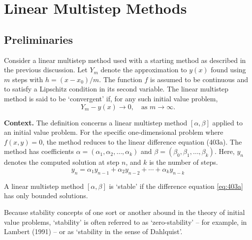 \chapter{Linear Multistep Methods}

\section{Preliminaries}

\begin{definition}

  \label{def:402A}
Consider a linear multistep method used with a starting method as described in the previous discussion. Let $Y_m$ denote the approximation to $y(x)$ found using $m$ steps with $h = (x - x_0)/m$. The function $f$ is assumed to be continuous and to satisfy a Lipschitz condition in its second variable. The linear multistep method is said to be `convergent' if, for any such initial value problem,
\[
Y_m - y(x) \to 0, \quad \text{as } m \to \infty.
\]
\end{definition}

\noindent\textbf{Context.}
The definition concerns a linear multistep method $[\alpha, \beta]$ applied to an initial value problem. For the specific one-dimensional problem where $f(x, y) = 0$, the method reduces to the linear difference equation (403a). The method has coefficients $\alpha = (\alpha_1, \alpha_2, \dots, \alpha_k)$ and $\beta = (\beta_0, \beta_1, \dots, \beta_k)$. Here, $y_n$ denotes the computed solution at step $n$, and $k$ is the number of steps.
\begin{equation}
y_n = \alpha_1 y_{n-1} + \alpha_2 y_{n-2} + \cdots + \alpha_k y_{n-k}
\tag{403a}
\end{equation}

\begin{definition}

  \label{def:403A}
A linear multistep method $[\alpha, \beta]$ is `stable' if the difference equation \eqref{eq:403a} has only bounded solutions.

Because stability concepts of one sort or another abound in the theory of initial value problems, `stability' is often referred to as `zero-stability' -- for example, in Lambert (1991) -- or as `stability in the sense of Dahlquist'.
\end{definition}

